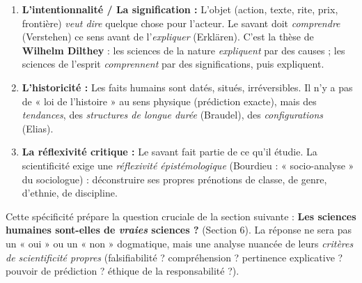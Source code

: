 \documentclass[11pt]{article}
\begin{document}
\begin{aretenir}
\begin{enumerate}
    \item \textbf{L'intentionnalité / La signification :} L'objet (action, texte, rite, prix, frontière) \emph{veut dire} quelque chose pour l'acteur. Le savant doit \emph{comprendre} (Verstehen) ce sens avant de l'\emph{expliquer} (Erklären). C'est la thèse de \textbf{Wilhelm Dilthey} : les sciences de la nature \emph{expliquent} par des causes ; les sciences de l'esprit \emph{comprennent} par des significations, puis expliquent.
    \item \textbf{L'historicité :} Les faits humains sont datés, situés, irréversibles. Il n'y a pas de « loi de l'histoire » au sens physique (prédiction exacte), mais des \emph{tendances}, des \emph{structures de longue durée} (Braudel), des \emph{configurations} (Elias).
    \item \textbf{La réflexivité critique :} Le savant fait partie de ce qu'il étudie. La scientificité exige une \emph{réflexivité épistémologique} (Bourdieu : « socio-analyse » du sociologue) : déconstruire ses propres prénotions de classe, de genre, d'ethnie, de discipline.
\end{enumerate}
\end{aretenir}

Cette spécificité prépare la question cruciale de la section suivante : \textbf{Les sciences humaines sont-elles de \emph{vraies} sciences ?} (Section 6). La réponse ne sera pas un « oui » ou un « non » dogmatique, mais une analyse nuancée de leurs \emph{critères de scientificité propres} (falsifiabilité ? compréhension ? pertinence explicative ? pouvoir de prédiction ? éthique de la responsabilité ?).
\end{document}
